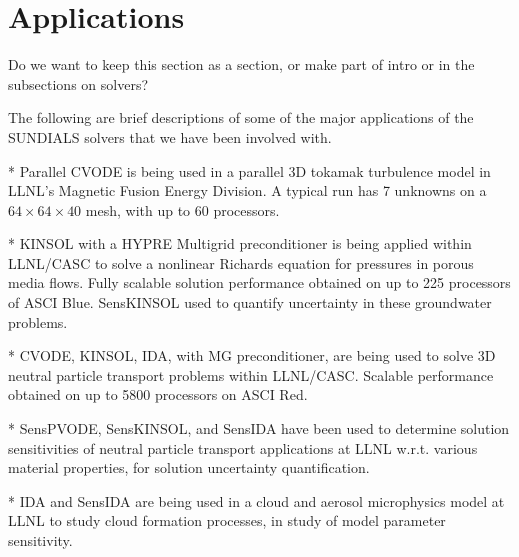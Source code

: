 \section{Applications}
\label{s:applications}

{\sf Do we want to keep this section as a section, or make part of intro or in the subsections on solvers?}

The following are brief descriptions of some of the major applications
of the SUNDIALS solvers that we have been involved with.

* Parallel CVODE is being used in a parallel 3D tokamak turbulence model in
LLNL's Magnetic Fusion Energy Division.  A typical run has 7 unknowns
on a $64 \times 64 \times 40$ mesh, with up to 60 processors.

* KINSOL with a HYPRE Multigrid preconditioner is being applied within
LLNL/CASC to solve a nonlinear Richards equation for pressures in
porous media flows.  Fully scalable solution performance obtained on
up to 225 processors of ASCI Blue.  SensKINSOL used to quantify
uncertainty in these groundwater problems.

* CVODE, KINSOL, IDA, with MG preconditioner, are being used to
solve 3D neutral particle transport problems within LLNL/CASC.
Scalable performance obtained on up to 5800 processors on ASCI Red.

* SensPVODE, SensKINSOL, and SensIDA have been used to determine
solution sensitivities of neutral particle transport applications at
LLNL w.r.t. various material properties, for solution uncertainty
quantification.

* IDA and SensIDA are being used in a cloud and aerosol microphysics
model at LLNL to study cloud formation processes, in study of model
parameter sensitivity.


